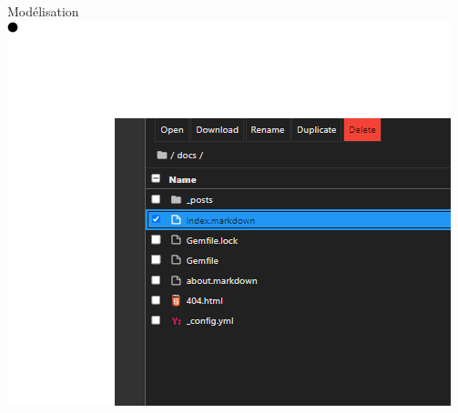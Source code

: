 \documentclass{beamer}
\begin{document}
\begin{frame}{Modélisation}
    \includegraphics[width=\textwidth]{assets/test.png} %
\end{frame}
\end{document}
